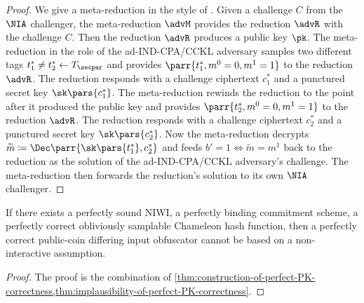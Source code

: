 \begin{proof}
    We give a meta-reduction in the style of \cite{EC:Coron02}.
    Given a challenge \(C\) from the \(\NIA\) challenger,
    the meta-reduction \(\advM\) provides the reduction \(\advR\) with the challenge \(C\).
    Then the reduction \(\advR\) produces a public key \(\pk\).
    The meta-reduction in the role of the ad-IND-CPA/CCKL adversary samples two different tags \(t^*_1 \neq t^*_2 \gets T_\secpar\) and provides \(\parr{t^*_1,m^0=0,m^1=1}\) to the reduction \(\advR\).
    The reduction responds with a challenge ciphertext \(c^*_1\) and a punctured secret key \(\sk\pars{c^*_1}\).
    The meta-reduction rewinds the reduction to the point after it produced the public key and provides \(\parr{t^*_2,m^0=0,m^1=1}\) to the reduction \(\advR\).
    The reduction responds with a challenge ciphertext \(c^*_2\) and a punctured secret key \(\sk\pars{c^*_2}\).
    Now the meta-reduction decrypts \(\widetilde{m} \coloneqq \Dec\parr{\sk\pars{t^*_1},c^*_2}\) and feeds \(b' = 1 \iff \widetilde{m} = m^1\) back to the reduction as the solution of the ad-IND-CPA/CCKL adversary's challenge.
    The meta-reduction then forwards the reduction's solution to its own \(\NIA\) challenger.
\end{proof}


\begin{theorem}
    If there exists a perfectly sound NIWI,
    a perfectly binding commitment scheme,
    a perfectly correct obliviously samplable Chameleon hash function,
    then a perfectly correct public-coin differing input obfuscator cannot be based on a non-interactive assumption.
\end{theorem}

\begin{proof}
    The proof is the combination of \cref{thm:construction-of-perfect-PK-correctness,thm:implausibility-of-perfect-PK-correctness}.
\end{proof}